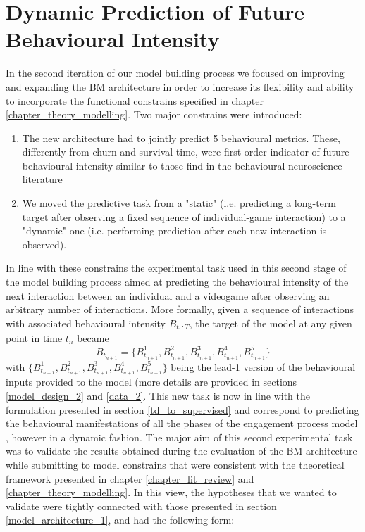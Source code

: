 \section{Dynamic Prediction of Future Behavioural Intensity}
\label{model_architecture_2}
In the second iteration of our model building process we focused on improving and expanding the BM architecture in order to increase its flexibility and ability to incorporate the functional constrains specified in chapter \ref{chapter_theory_modelling}. Two major constrains were introduced:
\begin{enumerate}
    \item The new architecture had to jointly predict 5 behavioural metrics. These, differently from churn and survival time, were first order indicator of future behavioural intensity similar to those find in the behavioural neuroscience literature \cite{schultz1997neural,mcclure2003computational,berridge2004motivation,zhang2009neural}
    \item We moved the predictive task from a "static" (i.e. predicting a long-term target after observing a fixed sequence of individual-game interaction) to a "dynamic" one (i.e. performing prediction after each new interaction is observed).
\end{enumerate}
In line with these constrains the experimental task used in this second stage of the model building process aimed at predicting the behavioural intensity of the next interaction between an individual and a videogame after observing an arbitrary number of interactions. More formally, given a sequence of interactions with associated behavioural intensity $B_{t_1 : T}$, the target of the model at any given point in time $t_n$ became
\begin{equation}
\label{joint_target_eq}
   B_{t_{n+1}} = \{B^1_{t_{n+1}}, B^2_{t_{n+1}}, B^3_{t_{n+1}}, B^4_{t_{n+1}}, B^5_{t_{n+1}}\}
\end{equation}
with $\{B^1_{t_{n+1}}, B^2_{t_{n+1}}, B^3_{t_{n+1}}, B^4_{t_{n+1}}, B^5_{t_{n+1}}\}$ being the lead-1 version of the behavioural inputs provided to the model (more details are provided in sections \ref{model_design_2} and \ref{data_2}. This new task is now in line with the formulation presented in section \ref{td_to_supervised} and correspond to predicting the behavioural manifestations of all the phases of the engagement process model \cite{o2008user}, however in a dynamic fashion. The major aim of this second experimental task was to validate the results obtained during the evaluation of the BM architecture while submitting to model constrains that were consistent with the theoretical framework presented in chapter \ref{chapter_lit_review} and \ref{chapter_theory_modelling}. In this view, the hypotheses that we wanted to validate were tightly connected with those presented in section \ref{model_architecture_1}, and had the following form:
